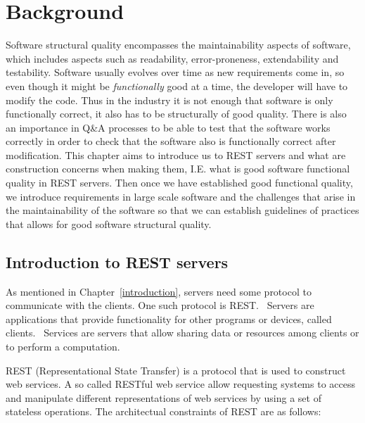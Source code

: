 \chapter{Background}\label{background}

Software structural quality encompasses the maintainability aspects of software,
which includes aspects such as readability, error-proneness, extendability and
testability. Software usually evolves over time as new requirements come in, so
even though it might be \textit{functionally} good at a time, the developer will
have to modify the code. Thus in the industry it is not enough that software is
only functionally correct, it also has to be structurally of good quality. There
is also an importance in Q\&A processes to be able to test that the software
works correctly in order to check that the software also is functionally correct
after modification. This chapter aims to introduce us to REST servers and what
are construction concerns when making them, I.E. what is good software
functional quality in REST servers. Then once we have established good
functional quality, we introduce requirements in large scale software and the
challenges that arise in the maintainability of the software so that we can
establish guidelines of practices that allows for good software structural
quality.

\section{Introduction to REST servers}

As mentioned in Chapter~\ref{introduction}, servers need some protocol to
communicate with the clients. One such protocol is
REST.~\cite{Fielding:2000:ASD:932295} Servers are applications that provide
functionality for other programs or devices, called
clients.~\cite{Fielding:2000:ASD:932295} Services are servers that allow sharing
data or resources among clients or to perform a computation.

REST (Representational State Transfer) is a protocol that is used to construct
web services. A so called RESTful web service allow requesting systems to access
and manipulate different representations of web services by using a set of
stateless operations. The architectual constraints of REST are as follows:

